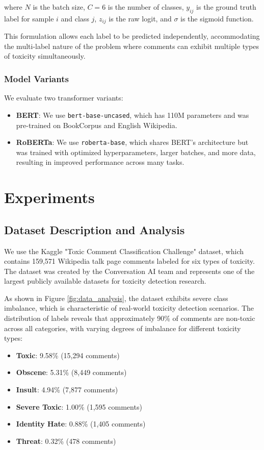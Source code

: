 \documentclass[11pt]{article}
\begin{document}
where $N$ is the batch size, $C=6$ is the number of classes, $y_{ij}$ is the ground truth label for sample $i$ and class $j$, $z_{ij}$ is the raw logit, and $\sigma$ is the sigmoid function.

This formulation allows each label to be predicted independently, accommodating the multi-label nature of the problem where comments can exhibit multiple types of toxicity simultaneously.

\subsubsection{Model Variants}

We evaluate two transformer variants:

\begin{itemize}
    \item \textbf{BERT}: We use \texttt{bert-base-uncased}, which has 110M parameters and was pre-trained on BookCorpus and English Wikipedia.
    \item \textbf{RoBERTa}: We use \texttt{roberta-base}, which shares BERT's architecture but was trained with optimized hyperparameters, larger batches, and more data, resulting in improved performance across many tasks.
\end{itemize}

\section{Experiments}

\subsection{Dataset Description and Analysis}

We use the Kaggle "Toxic Comment Classification Challenge" dataset, which contains 159,571 Wikipedia talk page comments labeled for six types of toxicity. The dataset was created by the Conversation AI team and represents one of the largest publicly available datasets for toxicity detection research.

As shown in Figure \ref{fig:data_analysis}, the dataset exhibits severe class imbalance, which is characteristic of real-world toxicity detection scenarios. The distribution of labels reveals that approximately 90\% of comments are non-toxic across all categories, with varying degrees of imbalance for different toxicity types:

\begin{itemize}
    \item \textbf{Toxic}: 9.58\% (15,294 comments)
    \item \textbf{Obscene}: 5.31\% (8,449 comments)
    \item \textbf{Insult}: 4.94\% (7,877 comments)
    \item \textbf{Severe Toxic}: 1.00\% (1,595 comments)
    \item \textbf{Identity Hate}: 0.88\% (1,405 comments)
    \item \textbf{Threat}: 0.32\% (478 comments)
\end{itemize}
\end{document}

